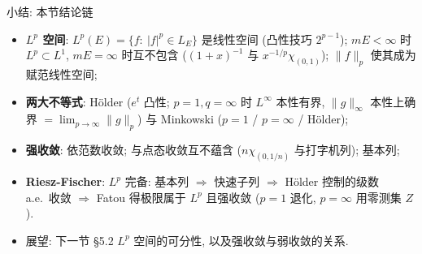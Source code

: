 \begin{frame}{小结: 本节结论链}

\begin{itemize}
\item \textbf{$L^p$ 空间}: $L^p(E) = \{ f:\ |f|^p \in L_E \}$ 是线性空间
  (凸性技巧 $2^{p-1}$); $mE < \infty$ 时 $L^p \subset L^1$,
  $mE = \infty$ 时互不包含 ($(1+x)^{-1}$ 与 $x^{-1/p}\chi_{(0,1)}$);
  $\lVert f \rVert_p$ 使其成为赋范线性空间;
\item \textbf{两大不等式}: Hölder ($e^t$ 凸性; $p=1,q=\infty$ 时 $L^\infty$ 本性有界,
  $\lVert g \rVert_\infty$ 本性上确界 $= \lim_{p \to \infty} \lVert g \rVert_p$) 与
  Minkowski ($p=1$ / $p=\infty$ / Hölder);
\item \textbf{强收敛}: 依范数收敛; 与点态收敛互不蕴含
  ($n\chi_{(0, 1/n)}$ 与打字机列); 基本列;
\item \textbf{Riesz-Fischer}: $L^p$ 完备:
  基本列 $\Rightarrow$ 快速子列 $\Rightarrow$ Hölder 控制的级数 a.e.\ 收敛
  $\Rightarrow$ Fatou 得极限属于 $L^p$ 且强收敛 ($p = 1$ 退化, $p = \infty$ 用零测集 $Z$).
\end{itemize}

\pause

\begin{itemize}
\item 展望: 下一节 \S 5.2 $L^p$ 空间的可分性, 以及强收敛与弱收敛的关系.
\end{itemize}

\end{frame}



